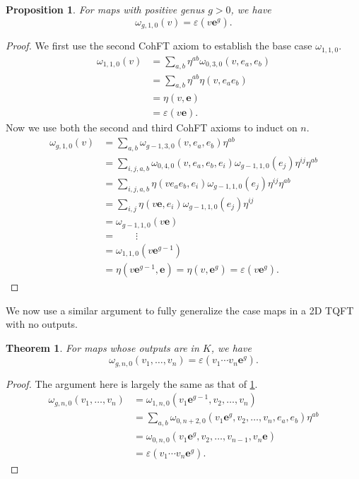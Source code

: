\documentclass{amsart}
\newcommand{\be}{\begin{equation}}
\newcommand{\ee}{\end{equation}}
\newcommand{\eps}{\varepsilon}
\newcommand{\eul}{\mathbf{e}}
\newtheorem{Thm}[Lem]{Theorem}
\newtheorem{Prop}[Lem]{Proposition}
\theoremstyle{definition}
\begin{document}
\begin{Prop}\label{prop:g10case}
    For maps with positive genus $g>0$, we have
    \be\label{eqn:g10case}
    \omega_{g,1,0}(v)=\eps(v\eul^g).
    \ee
\end{Prop}
\begin{proof}
    We first use the second CohFT axiom to establish the base case $\omega_{1,1,0}.$
    \begin{align*}
        \omega_{1,1,0}(v)&=\sum_{a,b}\eta^{ab}\omega_{0,3,0}(v,e_a,e_b)\\
        &=\sum_{a,b}\eta^{ab}\eta(v,e_ae_b)\\
        &=\eta(v,\eul)\\
        &=\eps(v\eul).
    \end{align*}
    \noindent Now we use both the second and third CohFT axioms to induct on $n$.
    \begin{align*}
        \omega_{g,1,0}(v)&=\sum_{a,b}\omega_{g-1,3,0}(v,e_a,e_b)\eta^{ab}\\
        &=\sum_{i,j,a,b}\omega_{0,4,0}(v,e_a,e_b,e_i)\omega_{g-1,1,0}(e_j)\eta^{ij}\eta^{ab}\\
        &=\sum_{i,j,a,b}\eta(ve_ae_b,e_i)\omega_{g-1,1,0}(e_j)\eta^{ij}\eta^{ab}\\
        &=\sum_{i,j}\eta(v\eul,e_i)\omega_{g-1,1,0}(e_j)\eta^{ij}\\
        &=\omega_{g-1,1,0}(v\eul)\\
        &=\qquad\vdots\\
        &=\omega_{1,1,0}(v\eul^{g-1})\\
        &=\eta(v\eul^{g-1},\eul)=\eta(v,\eul^g)=\eps(v\eul^g).
    \end{align*}
\end{proof}
\noindent We now use a similar argument to fully generalize the case maps in a 2D TQFT with no outputs.
\begin{Thm}\cite{DM_invitation,DM_ribbon}\label{prop:gn0case}
    For maps whose outputs are in $K$, we have
    \be\label{eqn:gn0case}
    \omega_{g,n,0}(v_1,\ldots,v_n)=\eps(v_1\cdots v_n\eul^g).
    \ee
\end{Thm}
\begin{proof}
    The argument here is largely the same as that of \ref{prop:g10case}.
    \begin{align*}
        \omega_{g,n,0}(v_1,\ldots,v_n)&=\omega_{1,n,0}(v_1\eul^{g-1},v_2,\ldots,v_n)\\
        &=\sum_{a,b}\omega_{0,n+2,0}(v_1\eul^g,v_2,\ldots,v_n,e_a,e_b)\eta^{ab}\\
        &=\omega_{0,n,0}(v_1\eul^g,v_2,\ldots,v_{n-1},v_n\eul)\\
        &=\eps(v_1\cdots v_n\eul^g).
    \end{align*}
\end{proof}
 
\end{document}
